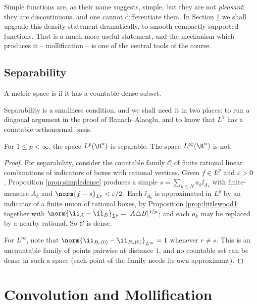 Simple functions are, as their name suggests, simple, but they are not \emph{pleasant}: they are discontinuous, and one cannot differentiate them. In Section \ref{sec:mollify} we shall upgrade this density statement dramatically, to smooth compactly supported functions. That is a much more useful statement, and the mechanism which produces it -- mollification -- is one of the central tools of the course.

\subsection{Separability}

\begin{definition}
	A metric space is  if it has a countable dense subset.
\end{definition}

Separability is a smallness condition, and we shall need it in two places: to run a diagonal argument in the proof of Banach--Alaoglu, and to know that $L^2$ has a countable orthonormal basis.

\begin{proposition}\label{prop:separable}
	For $1 \le p < \infty$, the space $L^p(\R^n)$ is separable. The space $L^\infty(\R^n)$ is not.
\end{proposition}

\begin{proof}
	For separability, consider the countable family $\mathcal{C}$ of finite rational linear combinations of indicators of boxes with rational vertices. Given $f \in L^p$ and $\varepsilon > 0$, Proposition \ref{prop:simpledense} produces a simple $s = \sum_{k \le N} a_k \ii_{A_k}$ with finite-measure $A_k$ and $\norm{f - s}_{L^p} < \varepsilon/2$. Each $\ii_{A_k}$ is approximated in $L^p$ by an indicator of a finite union of rational boxes, by Proposition \ref{prop:littlewood1} together with $\norm{\ii_A - \ii_B}_{L^p} = |A \triangle B|^{1/p}$; and each $a_k$ may be replaced by a nearby rational. So $\mathcal{C}$ is dense.

	For $L^\infty$, note that $\norm{\ii_{B_r(0)} - \ii_{B_s(0)}}_{L^\infty} = 1$ whenever $r \ne s$. This is an uncountable family of points pairwise at distance $1$, and no countable set can be dense in such a space (each point of the family needs its own approximant).
\end{proof}

\section{Convolution and Mollification}\label{sec:mollify}

